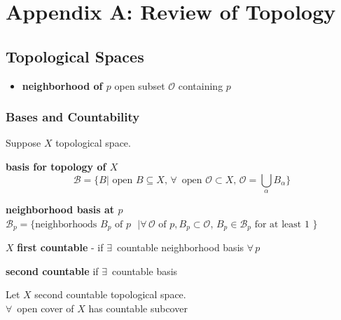 \section{Appendix A: Review of Topology}

\subsection*{Topological Spaces}

\begin{itemize}
  \item \textbf{neighborhood of $p$} open subset $\mathcal{O}$ containing $p$
\end{itemize}



\subsubsection*{Bases and Countability}

Suppose $X$ topological space.

\textbf{basis for topology of $X$ } \[
\mathcal{B} = \lbrace B | \text{ open } B \subseteq X, \, \forall \,  \text{ open } \mathcal{O} \subset X, \, \mathcal{O} = \bigcup_{\alpha} B_{\alpha} \rbrace
\]

\textbf{neighborhood basis at $p$ } $\mathcal{B}_p = \lbrace \text{neighborhoods } B_p \text{ of $p$ } | \forall \, \mathcal{O} \text{ of } p,  B_p \subset \mathcal{O}, \, B_p \in \mathcal{B}_p \text{ for at least 1 } \rbrace$

$X$ \textbf{first countable }- if $\exists \, $ countable neighborhood basis $\forall \, p$

\textbf{second countable } if $\exists \, $ countable basis

\begin{proposition}[A.16]  Let $X$ second countable topological space. \\
$\forall \, $ open cover of $X$ has countable subcover
\end{proposition}

